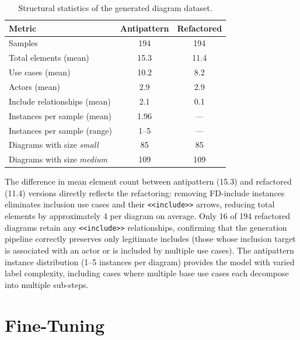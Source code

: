 \documentclass[sigconf,review,anonymous]{acmart}
\begin{document}
\begin{table}[h]
\centering
\caption{Structural statistics of the generated diagram dataset.}
\label{tab:stats}
\begin{tabular}{lcc}
\toprule
\textbf{Metric} & \textbf{Antipattern} & \textbf{Refactored} \\
\midrule
Samples                           & 194   & 194   \\
\midrule
Total elements (mean)           & 15.3  & 11.4  \\
Use cases (mean)                  & 10.2  & 8.2   \\
Actors (mean)                     & 2.9   & 2.9   \\
Include relationships (mean)      & 2.1   & 0.1   \\
\midrule
Instances per sample (mean)       & 1.96  & —     \\
Instances per sample (range)      & 1–5   & —     \\
\midrule
Diagrams with size \emph{small}   & 85    & 85    \\
Diagrams with size \emph{medium}  & 109   & 109   \\
\bottomrule
\end{tabular}
\end{table}

The difference in mean element count between antipattern (15.3) and
refactored (11.4) versions directly reflects the refactoring: removing
FD-include instances eliminates inclusion use cases and their
\texttt{<<include>>} arrows, reducing total elements by approximately 4 per
diagram on average.  Only 16 of 194 refactored diagrams retain any
\texttt{<<include>>} relationships, confirming that the generation pipeline
correctly preserves only legitimate includes (those whose inclusion
target is associated with an actor or is included by multiple use cases).
The antipattern instance distribution (1--5 instances per diagram) provides
the model with varied label complexity, including cases
where multiple base use cases each decompose into multiple sub-steps.

\section{Fine-Tuning}
\label{sec:finetuning}
\end{document}
